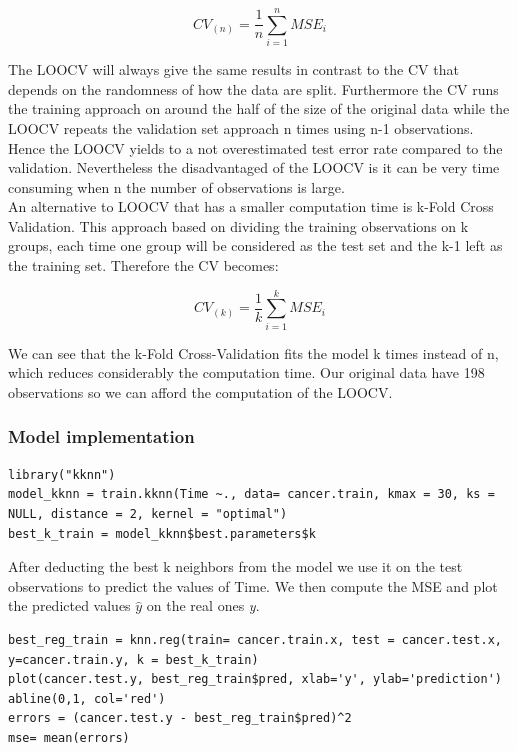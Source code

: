 \documentclass[]{report}
\begin{document}
\begin{center}
	$$CV_{(n)} = \frac{1}{n} \sum_{i=1}^{n} MSE_{i} $$
\end{center}

The LOOCV will always give the same results in contrast to the CV that depends on the randomness of how the data are split. Furthermore the CV runs the training approach on around the half of the size of the original data while the LOOCV repeats the validation set approach n times using n-1 observations. Hence the LOOCV yields to a not overestimated test error rate compared to the validation. Nevertheless the disadvantaged of the LOOCV is it can be very time consuming when n the number of observations is large.\\

An alternative to LOOCV that has a smaller computation time is k-Fold Cross Validation. This approach based on dividing the training observations on k groups, each time one group will be considered as the test set and the k-1 left as the training set. Therefore the CV becomes:

\begin{center}
	$$CV_{(k)} = \frac{1}{k} \sum_{i=1}^{k} MSE_{i} $$
\end{center}

We can see that the k-Fold Cross-Validation fits the model k times instead of n, which reduces considerably the computation time. Our original data have 198 observations so we can afford the computation of the LOOCV. \\

\subsubsection{Model implementation}

\begin{lstlisting}
library("kknn")
model_kknn = train.kknn(Time ~., data= cancer.train, kmax = 30, ks = NULL, distance = 2, kernel = "optimal")
best_k_train = model_kknn$best.parameters$k
\end{lstlisting}

After deducting the best k neighbors from the model we use it on the test observations to predict the values of Time. 
We then compute the MSE and plot the predicted values $\hat{y}$ on the real ones \textit{y}.

\begin{lstlisting}
best_reg_train = knn.reg(train= cancer.train.x, test = cancer.test.x, y=cancer.train.y, k = best_k_train)
plot(cancer.test.y, best_reg_train$pred, xlab='y', ylab='prediction')
abline(0,1, col='red')
errors = (cancer.test.y - best_reg_train$pred)^2
mse= mean(errors)
\end{lstlisting}
\end{document}
